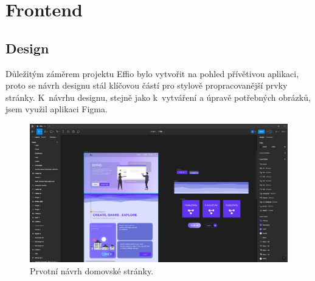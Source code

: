 \documentclass[12pt, a4paper,
openright
]{report}
\let\oldchapter\chapter
\renewcommand{\chapter}{
	\clearpage
	\pagestyle{fancy}
	\oldchapter
}
\begin{document}

\chapter{Frontend}

\section{Design}
Důležitým záměrem projektu Effio bylo vytvořit na pohled přívětivou aplikaci, proto se návrh designu stál klíčovou částí pro stylově propracovanější prvky stránky. K~návrhu designu, stejně jako k~vytváření a úpravě potřebných obrázků, jsem využil aplikaci Figma.
\begin{figure}[H]
	\centering %
	\includegraphics[width=0.8\linewidth]{image/figma.png} 
	\caption{Prvotní návrh domovské stránky.} %
	\label{fig:figma} %
\end{figure}
\end{document}
